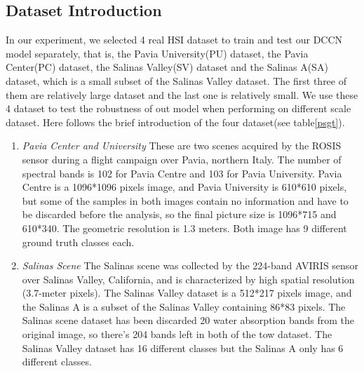 \documentclass{article}
\begin{document}
	\subsection{Dataset Introduction}\label{subsec:dataset-introduction}
	In our experiment, we selected 4 real HSI dataset to train and test our DCCN model separately, that is, the
	Pavia University(PU) dataset, the Pavia Center(PC) dataset, the Salinas Valley(SV) dataset and the Salinas A(SA)
	dataset, which is a small subset of the Salinas Valley dataset.
	The first three of them are relatively large dataset and the last one is relatively small.
	We use these 4 dataset to test the robustness of out model when performing on different scale dataset.
	Here follows the brief introduction of the four dataset(see table\ref{psgt}).
	\begin{enumerate}[1)]
		\item \textit{Pavia Center and University} These are two scenes acquired by the ROSIS sensor during a flight
		campaign over Pavia, northern Italy.
		The number of spectral bands is 102 for Pavia Centre and 103 for Pavia University.
		Pavia Centre is a 1096*1096 pixels image, and Pavia University is 610*610 pixels, but some of the samples in
		both images contain no information and have to be discarded before the analysis, so the final picture size is
		1096*715 and 610*340.
		The geometric resolution is 1.3 meters.
		Both image has 9 different ground truth classes each.
		\item \textit{Salinas Scene} The Salinas scene was collected by the 224-band AVIRIS sensor over Salinas Valley,
		California, and is characterized by high spatial resolution (3.7-meter pixels).
		The Salinas Valley dataset is a 512*217 pixels image, and the Salinas A is a subset of the Salinas Valley
		containing 86*83 pixels.
		The Salinas scene dataset has been discarded 20 water absorption bands from the original image, so there's 204
		bands left in both of the tow dataset.
		The Salinas Valley dataset has 16 different classes but the Salinas A only has 6 different classes.
	\end{enumerate}
\end{document}
